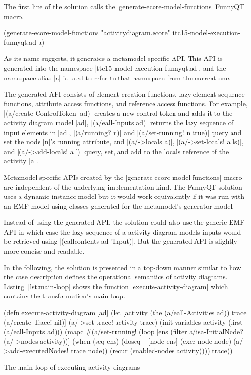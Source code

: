 \documentclass[submission]{eptcs}
\newcommand{\code}{\clojureinline}
\begin{document}
The first line of the solution calls the \code|generate-ecore-model-functions|
FunnyQT macro.

\begin{clojurecode}
(generate-ecore-model-functions "activitydiagram.ecore" ttc15-model-execution-funnyqt.ad a)
\end{clojurecode}

As its name suggests, it generates a metamodel-specific API.  This API is
generated into the namespace \code|ttc15-model-execution-funnyqt.ad|, and the
namespace alias \code|a| is used to refer to that namespace from the current
one.

The generated API consists of element creation functions, lazy element sequence
functions, attribute access functions, and reference access functions.  For
example, \code|(a/create-ControlToken! ad)| creates a new control token and
adds it to the activity diagram model \code|ad|, \code|(a/eall-Inputs ad)|
returns the lazy sequence of input elements in \code|ad|, \code|(a/running? n)|
and \code|(a/set-running! n true)| query and set the node \code|n|'s
\textsf{running} attribute, and \code|(a/->locals a)|, \code|(a/->set-locals! a
ls)|, and \code|(a/->add-locals! a l)| query, set, and add to the
\textsf{locals} reference of the activity \code|a|.

Metamodel-specific APIs created by the \code|generate-ecore-model-functions|
macro are independent of the underlying implementation kind.  The FunnyQT
solution uses a dynamic instance model but it would work equivalently if it was
run with an EMF model using classes generated for the metamodel's generator
model.

Instead of using the generated API, the solution could also use the generic EMF
API in which case the lazy sequence of a activity diagram models inputs would
be retrieved using \code|(eallcontents ad 'Input)|.  But the generated API is
slightly more concise and readable.

\bigskip{}

In the following, the solution is presented in a top-down manner similar to how
the case description defines the operational semantics of activity diagrams.
Listing~\vref{lst:main-loop} shows the function \code|execute-activity-diagram|
which contains the transformation's main loop.

\begin{listing}[h!tb]
\begin{clojurecode}
(defn execute-activity-diagram [ad]
  (let [activity (the (a/eall-Activities ad))
        trace (a/create-Trace! nil)]
    (a/->set-trace! activity trace)
    (init-variables activity (first (a/eall-Inputs ad)))
    (mapc #(a/set-running! %
    (loop [ens (filter a/isa-InitialNode? (a/->nodes activity))]
      (when (seq ens)
        (doseq+ [node ens]
          (exec-node node)
          (a/->add-executedNodes! trace node))
        (recur (enabled-nodes activity))))
    trace))
\end{clojurecode}
\caption{The main loop of executing activity diagrams}
\label{lst:main-loop}
\end{listing}
\end{document}
